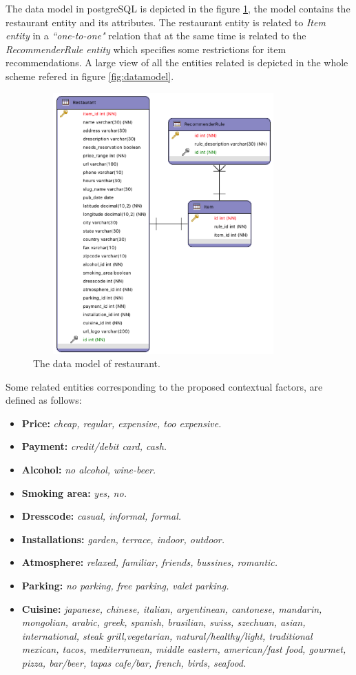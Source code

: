 The data model in postgreSQL is depicted in the figure
\ref{fig:restaurantmodeldata}, the model contains the restaurant
entity and its attributes. The restaurant entity is related to
\textit{Item entity} in a \textit{``one-to-one"} relation that at the
same time is related to the \textit{RecommenderRule entity} which
specifies some restrictions for item recommendations. A large view of
all the entities related is depicted in the whole scheme refered in
figure \ref{fig:datamodel}.
\begin{figure}
\captionsetup{justification=centering,margin=2cm,font=footnotesize}
\centering
\includegraphics[width=10cm,height=10cm,keepaspectratio]{img/data-resmodel.png}
\caption{The data model of restaurant.}
\label{fig:restaurantmodeldata}     
\end{figure}
Some related entities corresponding to the proposed contextual factors, 
are defined as follows: 
\begin{itemize}
\item \textbf{Price:} \textit{cheap, regular, expensive, too expensive.}
\item \textbf{Payment:} \textit{credit/debit card, cash.}
\item \textbf{Alcohol:} \textit{no alcohol, wine-beer.}
\item \textbf{Smoking area:} \textit{yes, no.}
\item \textbf{Dresscode:} \textit{casual, informal, formal.}
\item \textbf{Installations:} \textit{garden, terrace, indoor, outdoor.}
\item \textbf{Atmosphere:} \textit{relaxed, familiar, friends, bussines, romantic.}
\item \textbf{Parking:} \textit{no parking, free parking, valet parking.}
\item \textbf{Cuisine:} \textit{japanese, chinese, italian, argentinean,
cantonese, mandarin, mongolian, arabic, greek, spanish, brasilian,
swiss, szechuan, asian, international, steak grill,vegetarian,
natural/healthy/light, traditional mexican, tacos, mediterranean,
middle eastern, american/fast food, gourmet, pizza, bar/beer, tapas
cafe/bar, french, birds, seafood.}
\end{itemize}
